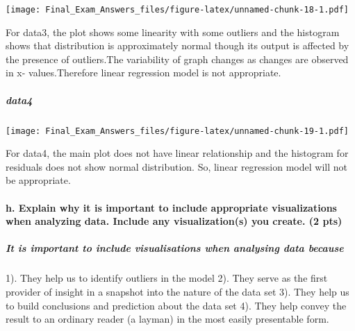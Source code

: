 \documentclass[]{article}
\newenvironment{Shaded}{\begin{snugshade}}{\end{snugshade}}
\newcommand{\KeywordTok}[1]{\textcolor[rgb]{0.13,0.29,0.53}{\textbf{#1}}}
\newcommand{\DataTypeTok}[1]{\textcolor[rgb]{0.13,0.29,0.53}{#1}}
\newcommand{\DecValTok}[1]{\textcolor[rgb]{0.00,0.00,0.81}{#1}}
\newcommand{\StringTok}[1]{\textcolor[rgb]{0.31,0.60,0.02}{#1}}
\newcommand{\OperatorTok}[1]{\textcolor[rgb]{0.81,0.36,0.00}{\textbf{#1}}}
\newcommand{\NormalTok}[1]{#1}
\let\oldparagraph\paragraph
\renewcommand{\paragraph}[1]{\oldparagraph{#1}\mbox{}}
\let\oldsubparagraph\subparagraph
\renewcommand{\subparagraph}[1]{\oldsubparagraph{#1}\mbox{}}
\begin{document}
\texttt{[image: Final\_Exam\_Answers\_files/figure-latex/unnamed-chunk-18-1.pdf]}

For data3, the plot shows some linearity with some outliers and the
histogram shows that distribution is approximately normal though its
output is affected by the presence of outliers.The variability of graph
changes as changes are observed in x- values.Therefore linear regression
model is not appropriate.

\subparagraph{data4}\label{data4}

\begin{Shaded}
\end{Shaded}

\texttt{[image: Final\_Exam\_Answers\_files/figure-latex/unnamed-chunk-19-1.pdf]}

For data4, the main plot does not have linear relationship and the
histogram for residuals does not show normal distribution. So, linear
regression model will not be appropriate.

\paragraph{h. Explain why it is important to include appropriate
visualizations when analyzing data. Include any visualization(s) you
create. (2
pts)}\label{h.-explain-why-it-is-important-to-include-appropriate-visualizations-when-analyzing-data.-include-any-visualizations-you-create.-2-pts}

\subparagraph{It is important to include visualisations when analysing
data
because}\label{it-is-important-to-include-visualisations-when-analysing-data-because}

1). They help us to identify outliers in the model 2). They serve as the
first provider of insight in a snapshot into the nature of the data set
3). They help us to build conclusions and prediction about the data set
4). They help convey the result to an ordinary reader (a layman) in the
most easily presentable form.
\end{document}
